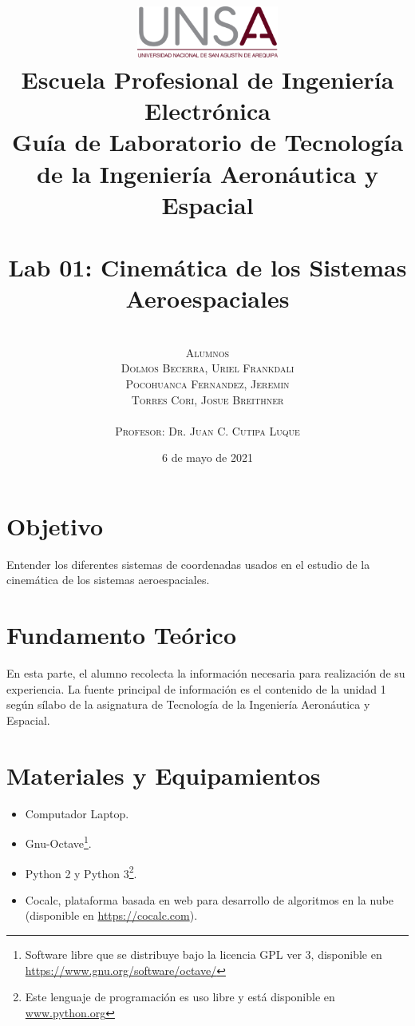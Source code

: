 \documentclass[12pt,oneside,spanish]{article}
\title{ 
	\includegraphics[width=0.35\textwidth]{unsa.eps}\\
	\vspace{0.1cm}
{\large Escuela Profesional de Ingeniería Electrónica \\
\vspace{2cm}
{\small Guía de Laboratorio de Tecnología de la Ingeniería Aeronáutica y Espacial}} \\ 
\vspace{0.1pt} 
\hrulefill \vspace{40pt} \\ 
\textbf{Lab 01: Cinemática de los Sistemas Aeroespaciales}\\ 
\vspace{30pt} \hrulefill}
\author{\scshape{\textbf{ }}
\vspace{30pt} \\
	\vspace{0.5cm}
	{\small Alumnos}\\
	{\Large Dolmos Becerra, Uriel Frankdali}\\
	{\Large Pocohuanca Fernandez, Jeremin}\\
	{\Large Torres Cori, Josue Breithner}\\
	\vspace{3cm}\\
{\small Profesor: Dr. Juan C. Cutipa Luque}\\
\vspace{20pt}
}
\date{6 de mayo de 2021}
\begin{document}

\maketitle

\newpage



\pagebreak

\tableofcontents

\newpage
{}

%
\section{Objetivo}
Entender los diferentes sistemas de coordenadas usados en el estudio de la cinemática de los sistemas aeroespaciales.
\section{Fundamento Teórico}
En esta parte, el alumno recolecta la información necesaria para realización de su experiencia. La fuente principal de información es el contenido de la unidad 1 según sílabo de la asignatura de Tecnología de la Ingeniería Aeronáutica y Espacial.

\section{Materiales y Equipamientos}
\begin{itemize}
    \item Computador Laptop.
    \item Gnu-Octave\footnote{Software libre que se distribuye bajo la licencia GPL ver 3, disponible en \url{https://www.gnu.org/software/octave/}}.
    \item Python 2 y Python 3\footnote{Este lenguaje de programación es uso libre y está disponible en \url{www.python.org}}.
    \item Cocalc, plataforma basada en web para desarrollo de algoritmos en la nube (disponible en \url{https://cocalc.com}).
\end{itemize}
\end{document}
